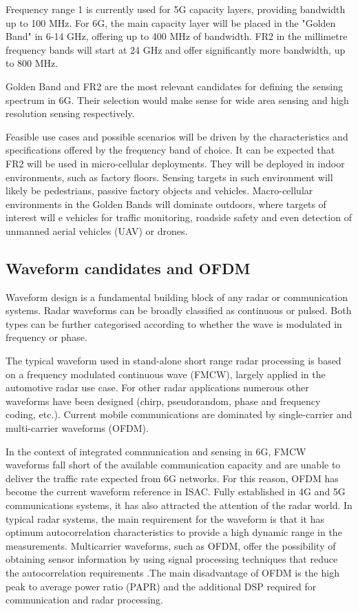 	Frequency range 1 is currently used for 5G capacity layers, providing bandwidth up to 100 MHz. For 6G, the main capacity layer will be placed in the "Golden Band" in 6-14 GHz, offering up to 400 MHz of bandwidth. FR2 in the millimetre frequency bands will start at 24 GHz and offer significantly more bandwidth, up to 800 MHz.
	
	Golden Band and FR2 are the most relevant candidates for defining the sensing spectrum in 6G. Their selection would make sense for wide area sensing and high resolution sensing respectively.
	
	Feasible use cases and possible scenarios will be driven by the characteristics and specifications offered by the frequency band of choice. It can be expected that FR2 will be used in micro-cellular deployments. They will be deployed in indoor environments, such as factory floors. Sensing targets in such environment will likely be pedestrians, passive factory objects and vehicles.
	Macro-cellular environments in the Golden Bands will dominate outdoors, where targets of interest will e vehicles for traffic monitoring, roadside safety and even detection of unmanned aerial vehicles (UAV) or drones.
	
	\subsection{Waveform candidates and OFDM}
	
	Waveform design is a fundamental building block of any radar or communication systems. 
	Radar waveforms can be broadly classified as continuous or pulsed. Both types can be further categorised according to whether the wave is modulated in frequency or phase. 
	
	The typical waveform used in stand-alone short range radar processing is based on a frequency modulated continuous wave (FMCW), largely applied in the automotive radar use case. For other radar applications numerous other waveforms have been designed (\eg chirp, pseudorandom, phase and frequency coding, etc.). Current mobile communications are dominated by single-carrier and multi-carrier waveforms (OFDM).
	 
	In the context of integrated communication and sensing in 6G, FMCW waveforms fall short of the available communication capacity and are unable to deliver the traffic rate expected from 6G networks. 
	For this reason, OFDM has become the current waveform reference in ISAC. Fully established in 4G and 5G communications systems, it has also attracted the attention of the radar world.
	In typical radar systems, the main requirement for the waveform is that it has optimum autocorrelation characteristics to provide a high dynamic range in the measurements. Multicarrier waveforms, such as OFDM, offer the possibility of obtaining sensor information by using signal processing techniques that reduce the autocorrelation requirements \cite{Sturm_Wiesbeck_2011}.The main disadvantage of OFDM is the high peak to average power ratio (PAPR) and the additional DSP required for communication and radar processing.
	
